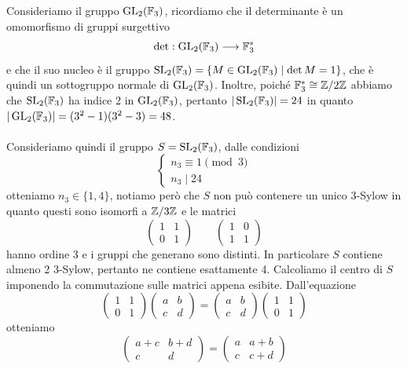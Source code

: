 \documentclass[11pt]{scrartcl}
\begin{document}
	Consideriamo il gruppo $\operatorname{GL}_2(\mathbb F_3)$, ricordiamo che il determinante è 
	un omomorfismo di gruppi surgettivo
	\[
	\det: \operatorname{GL}_2(\mathbb F_3) \longrightarrow \mathbb F_3^*
	\]
	e che il suo nucleo è il gruppo $\operatorname{SL}_2(\mathbb F_3) = \{M \in \operatorname{GL}_2(\mathbb F_3)\mid \det M = 1\}$,
	che è quindi un sottogruppo normale di $\operatorname{GL}_2(\mathbb F_3)$. Inoltre, poiché
	$\mathbb F_3^* \cong \mathbb{Z}/{2}\mathbb{Z}$ abbiamo che $\operatorname{SL}_2(\mathbb F_3)$ ha indice 2 in $\operatorname{GL}_2(\mathbb F_3)$, pertanto 
	$|\operatorname{SL}_2(\mathbb F_3)| = 24$ in quanto $|\operatorname{GL}_2(\mathbb F_3)| = (3^2 - 1)(3^2 - 3) = 48$.
	\\\\
	Consideriamo quindi il gruppo $S = \operatorname{SL}_2(\mathbb F_3)$, dalle condizioni 
	\[
	\begin{cases}
		n_3 \equiv 1 \pmod 3\\
		n_3 \mid 24
	\end{cases}
	\]
	otteniamo $n_3 \in \{1, 4\}$, notiamo però che $S$ non può contenere un unico 
	3-Sylow in quanto questi sono isomorfi a $\mathbb{Z}/{3}\mathbb{Z}$ e le matrici 
	\[
	\begin{pmatrix}
		1 & 1\\
		0 & 1
	\end{pmatrix}\qquad
	\begin{pmatrix}
		1 & 0\\
		1 & 1
	\end{pmatrix}
	\]
	hanno ordine 3 e i gruppi che generano sono distinti. In particolare $S$
	contiene almeno 2 3-Sylow, pertanto ne contiene esattamente 4.
	Calcoliamo il centro di $S$ imponendo la commutazione sulle matrici appena 
	esibite. Dall'equazione 
	\[
	\begin{pmatrix}
		1 & 1\\
		0 & 1
	\end{pmatrix}
	\begin{pmatrix}
		a & b\\
		c & d
	\end{pmatrix} = 
	\begin{pmatrix}
		a & b\\
		c & d
	\end{pmatrix}
	\begin{pmatrix}
		1 & 1\\
		0 & 1
	\end{pmatrix}
	\]
	otteniamo 
	\[
	\begin{pmatrix}
		a + c & b + d\\
		c & d
	\end{pmatrix} = 
	\begin{pmatrix}
		a & a + b\\
		c & c + d
	\end{pmatrix}
	\]
\end{document}
